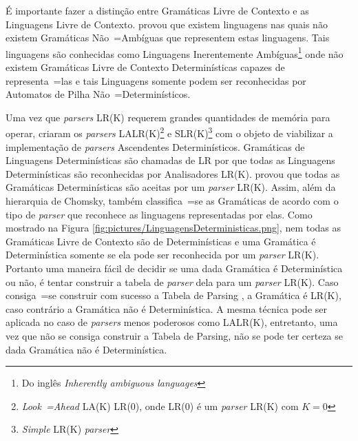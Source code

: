 {    É importante fazer a distinção entre Gramáticas Livre de Contexto e
    as Linguagens Livre de Contexto.
     provou que existem linguagens nas quais não
    existem Gramáticas Não~=Ambíguas que representem estas linguagens.
    Tais linguagens são conhecidas como Linguagens Inerentemente Ambíguas\footnote{Do
    inglês \textit{Inherently ambiguous languages}} onde não existem Gramáticas
    Livre de Contexto Determinísticas capazes de representa~=las e
    tais Linguagens somente podem ser reconhecidas por Automatos de Pilha Não~=Determinísticos.

    Uma vez que \textit{parsers} LR(K) requerem grandes quantidades de memória para operar,
     criaram os \textit{parsers}
    LALR(K)\footnote{\textit{Look~=Ahead} LA(K) LR(0),
    onde LR(0) é um \textit{parser} LR(K) com $K=0$
    } e
    SLR(K)\footnote{\textit{Simple} LR(K) \textit{parser}} com o objeto de
    viabilizar a implementação de \textit{parsers} Ascendentes Determinísticos.
    Gramáticas de Linguagens Determinísticas são chamadas de LR por que todas
    as Linguagens Determinísticas são reconhecidas por Analisadores LR(K).
     provou que todas as Gramáticas
    Determinísticas são aceitas por um \textit{parser} LR(K).
    Assim,
    além da hierarquia de Chomsky,
    também classifica~=se as Gramáticas de acordo com o tipo de
    \textit{parser} que reconhece as linguagens representadas por elas.
    Como mostrado na Figura \ref{fig:pictures/LinguagensDeterministicas.png},
    nem todas as Gramáticas Livre de Contexto são de Determinísticas e
    uma Gramática é Determinística somente se ela pode ser reconhecida por um \textit{parser} LR(K).
    Portanto uma maneira fácil de decidir se uma dada Gramática é Determinística ou não,
    é tentar construir a tabela de \textit{parser} dela para um \textit{parser} LR(K).
    Caso consiga~=se construir com sucesso a Tabela de Parsing \cite{ahoCompilerDragonBook},
    a Gramática é LR(K),
    caso contrário a Gramática não é Determinística.
    A mesma técnica pode ser aplicada no caso de \textit{parsers} menos poderosos como LALR(K),
    entretanto,
    uma vez que não se consiga construir a Tabela de Parsing,
    não se pode ter certeza se dada Gramática não é Determinística.

}

